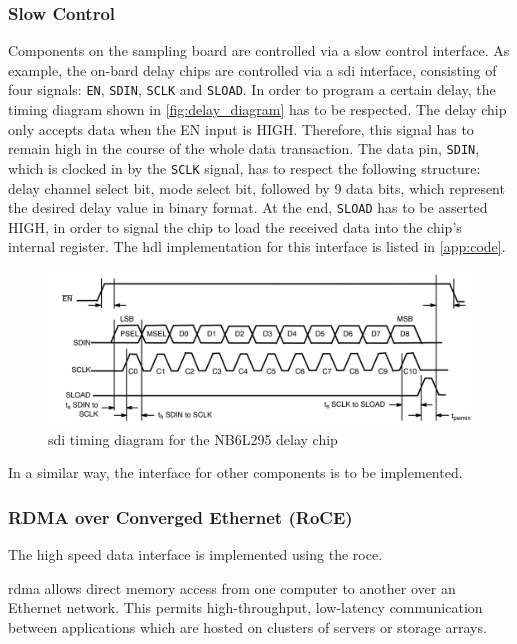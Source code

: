 \subsubsection*{Slow Control}
Components on the sampling board are controlled via a slow control interface. 
As example, the on-bard delay chips are controlled via a \gls{sdi} interface, consisting of four signals: \texttt{EN}, \texttt{SDIN}, \texttt{SCLK} and \texttt{SLOAD}. 
In order to program a certain delay, the timing diagram shown in \autoref{fig:delay_diagram} has to be respected.
The delay chip only accepts data when the EN input is HIGH. 
Therefore, this signal has to remain high in the course of the whole data transaction. 
The data pin, \texttt{SDIN}, which is clocked in by the \texttt{SCLK} signal, has to respect the following structure: delay channel select bit, mode select bit, followed by 9 data bits, which represent the desired delay value in binary format.
At the end, \texttt{SLOAD} has to be asserted HIGH, in order to signal the chip to load the received data into the chip's internal register.
The \gls{hdl} implementation for this interface is listed in \autoref{app:code}. %

\begin{figure}[tb]
	\centering
	\includegraphics[width = \textwidth]{chap/05-readout/img/sdi_interface_delay}
	\caption{\gls{sdi} timing diagram for the NB6L295 delay chip \cite{NB6L295}}
	\label{fig:delay_diagram}
\end{figure}

In a similar way, the interface for other components is to be implemented.

\subsubsection*{RDMA over Converged Ethernet (RoCE)}
The high speed data interface is implemented using the \gls{roce}.

\Gls{rdma} allows direct memory access from one computer to another over an Ethernet network. This permits high-throughput, low-latency communication between applications which are hosted on clusters of servers or storage arrays. 


